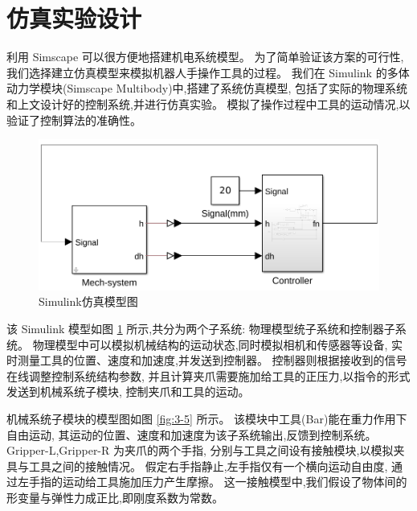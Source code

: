 \section{仿真实验设计}
利用 Simscape 可以很方便地搭建机电系统模型。
为了简单验证该方案的可行性,我们选择建立仿真模型来模拟机器人手操作工具的过程。
我们在 Simulink 的多体动力学模块(Simscape Multibody)中,搭建了系统仿真模型,
包括了实际的物理系统和上文设计好的控制系统,并进行仿真实验。
模拟了操作过程中工具的运动情况,以验证了控制算法的准确性。

\begin{figure}[!ht]
  \centering
  \includegraphics[scale=0.60]{chapter03/pic/3-4}
  \caption{Simulink仿真模型图}
  \label{fig:3-4}
  \vspace{-0.3cm}
\end{figure}

该 Simulink 模型如图 \ref{fig:3-4} 所示,共分为两个子系统:
物理模型统子系统和控制器子系统。
物理模型中可以模拟机械结构的运动状态,同时模拟相机和传感器等设备,
实时测量工具的位置、速度和加速度,并发送到控制器。
控制器则根据接收到的信号在线调整控制系统结构参数,
并且计算夹爪需要施加给工具的正压力,以指令的形式发送到机械系统子模块,
控制夹爪和工具的运动。

机械系统子模块的模型图如图 \ref{fig:3-5} 所示。
该模块中工具(Bar)能在重力作用下自由运动,
其运动的位置、速度和加速度为该子系统输出,反馈到控制系统。
Gripper-L,Gripper-R 为夹爪的两个手指,
分别与工具之间设有接触模块,以模拟夹具与工具之间的接触情况。
假定右手指静止,左手指仅有一个横向运动自由度,
通过左手指的运动给工具施加压力产生摩擦。
这一接触模型中,我们假设了物体间的形变量与弹性力成正比,即刚度系数为常数。

